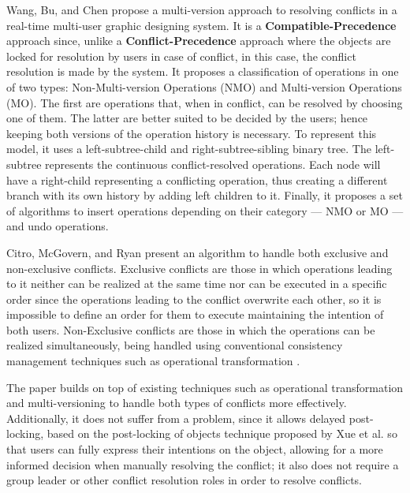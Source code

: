 Wang, Bu, and Chen \cite{Wang2002} propose a multi-version approach to resolving conflicts in a real-time multi-user graphic designing system. It is a \textbf{Compatible-Precedence} approach since, unlike a \textbf{Conflict-Precedence} approach where the objects are locked for resolution by users in case of conflict, in this case, the conflict resolution is made by the system. It proposes a classification of operations in one of two types: Non-Multi-version Operations (NMO) and Multi-version Operations (MO). The first are operations that, when in conflict, can be resolved by choosing one of them. The latter are better suited to be decided by the users; hence keeping both versions of the operation history is necessary.
To represent this model, it uses a left-subtree-child and right-subtree-sibling binary tree. The left-subtree represents the continuous conflict-resolved operations. Each node will have a right-child representing a conflicting operation, thus creating a different branch with its own history by adding left children to it. Finally, it proposes a set of algorithms to insert operations depending on their category --- NMO or MO --- and undo operations.

Citro, McGovern, and Ryan \cite{Citro2007} present an algorithm to handle both exclusive and non-exclusive conflicts. Exclusive conflicts are those in which operations leading to it neither can be realized at the same time nor can be executed in a specific order since the operations leading to the conflict overwrite each other, so it is impossible to define an order for them to execute maintaining the intention of both users. Non-Exclusive conflicts are those in which the operations can be realized simultaneously, being handled using conventional consistency management techniques such as operational transformation \cite{Ellis1989}.

The paper builds on top of existing techniques such as operational transformation and multi-versioning to handle both types of conflicts more effectively. Additionally, it does not suffer from a  problem, since it allows delayed post-locking, based on the post-locking of objects technique proposed by Xue et al. \cite{Xue2001} so that users can fully express their intentions on the object, allowing for a more informed decision when manually resolving the conflict; it also does not require a group leader or other conflict resolution roles in order to resolve conflicts.

